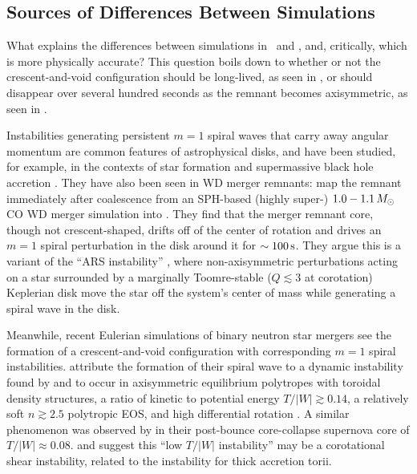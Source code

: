 
\subsection{Sources of Differences Between Simulations}
\label{ssec:c3_differences_merger_process}

What explains the differences between simulations in \gasoline\ and \arepo, and, critically, which is more physically accurate?  This question boils down to whether or not the crescent-and-void configuration should be long-lived, as seen in \arepo, or should disappear over several hundred seconds as the remnant becomes axisymmetric, as seen in \gasoline.


Instabilities generating persistent $m = 1$ spiral waves that carry away angular momentum are common features of astrophysical disks, and have been studied, for example, in the contexts of star formation \citep{adamrs89, shu+90, lin15, kratl16} and supermassive black hole accretion \citep{hopkq10}.  They have also been seen in WD merger remnants: \cite{kash+15} map the remnant immediately after coalescence from an SPH-based (highly super-\Mch) $1.0-1.1\,\Msun$ CO WD merger simulation into \flash.  They find that the merger remnant core, though not crescent-shaped, drifts off of the center of rotation and drives an $m = 1$ spiral perturbation in the disk around it for $\sim100\,\mathrm{s}$.  They argue this is a variant of the ``ARS instability'' \citep{adamrs89, shu+90}, where non-axisymmetric perturbations acting on a star surrounded by a marginally Toomre-stable ($Q \lesssim 3$ at corotation) Keplerian disk move the star off the system's center of mass while generating a spiral wave in the disk.

Meanwhile, recent Eulerian simulations of binary neutron star mergers \citep{pasc+15, radibo16} see the formation of a crescent-and-void configuration with corresponding $m = 1$ spiral instabilities.  \cite{pasc+15} attribute the formation of their spiral wave to a dynamic instability found by \cite{cent+01} and \cite{saijbs03} to occur in axisymmetric equilibrium polytropes with toroidal density structures, a ratio of kinetic to potential energy $T/|W| \gtrsim 0.14$, a relatively soft $n \gtrsim 2.5$ polytropic EOS, and high differential rotation \citep{saijbs03}.  A similar phenomenon was observed by \cite{ott+05} in their post-bounce core-collapse supernova core of $T/|W| \approx 0.08$.  \cite{wattaj05} and \cite{muhl+14} suggest this ``low $T/|W|$ instability'' may be a corotational shear instability, related to the \cite{papap84} instability for thick accretion torii.

